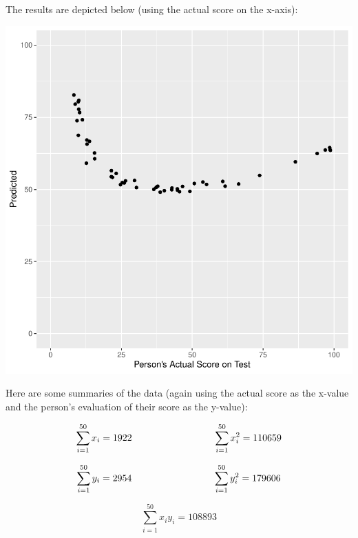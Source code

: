 \documentclass[addpoints]{examsetup}
\begin{document}
\begin{questions}
The results are depicted below (using the actual score on the x-axis):
\begin{center}
\includegraphics{stat305_q2-004}
\end{center}
\pagebreak
Here are some summaries of the data (again using the actual score as the x-value and the person's evaluation of their score as the y-value):

$$
   \sum_{i=1}^{50} x_i = 1922 \hspace{3cm} \sum_{i=1}^{50} x_i^2 = 110659 \\
$$

$$
   \sum_{i=1}^{50} y_i = 2954 \hspace{3cm} \sum_{i=1}^{50} y_i^2 = 179606 \\
$$

$$
   \sum_{i=1}^{50} x_i y_i = 108893
$$

\end{questions}
\end{document}
